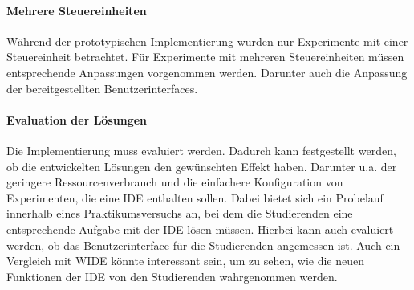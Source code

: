 \paragraph{Mehrere Steuereinheiten}
Während der prototypischen Implementierung wurden nur Experimente mit einer Steuereinheit betrachtet. Für Experimente mit mehreren Steuereinheiten müssen entsprechende Anpassungen vorgenommen werden. Darunter auch die Anpassung der bereitgestellten Benutzerinterfaces.

\paragraph{Evaluation der Lösungen}
Die Implementierung muss evaluiert werden. Dadurch kann festgestellt werden, ob die entwickelten Lösungen den gewünschten Effekt haben. Darunter u.a. der geringere Ressourcenverbrauch und die einfachere Konfiguration von Experimenten, die eine IDE enthalten sollen. Dabei bietet sich ein Probelauf innerhalb eines Praktikumsversuchs an, bei dem die Studierenden eine entsprechende Aufgabe mit der IDE lösen müssen. Hierbei kann auch evaluiert werden, ob das Benutzerinterface für die Studierenden angemessen ist. Auch ein Vergleich mit WIDE könnte interessant sein, um zu sehen, wie die neuen Funktionen der IDE von den Studierenden wahrgenommen werden.